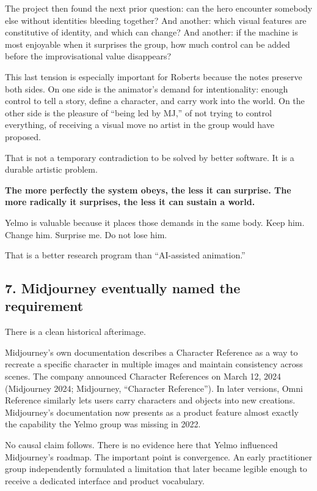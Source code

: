 \documentclass[
]{article}
\begin{document}
The project then found the next prior question: can the hero encounter
somebody else without identities bleeding together? And another: which
visual features are constitutive of identity, and which can change? And
another: if the machine is most enjoyable when it surprises the group,
how much control can be added before the improvisational value
disappears?

This last tension is especially important for Roberts because the notes
preserve both sides. On one side is the animator's demand for
intentionality: enough control to tell a story, define a character, and
carry work into the world. On the other side is the pleasure of ``being
led by MJ,'' of not trying to control everything, of receiving a visual
move no artist in the group would have proposed.

That is not a temporary contradiction to be solved by better software.
It is a durable artistic problem.

\textbf{The more perfectly the system obeys, the less it can surprise.
The more radically it surprises, the less it can sustain a world.}

Yelmo is valuable because it places those demands in the same body. Keep
him. Change him. Surprise me. Do not lose him.

That is a better research program than ``AI-assisted animation.''

\subsection{7. Midjourney eventually named the
requirement}\label{midjourney-eventually-named-the-requirement}

There is a clean historical afterimage.

Midjourney's own documentation describes a Character Reference as a way
to recreate a specific character in multiple images and maintain
consistency across scenes. The company announced Character References on
March 12, 2024 (Midjourney 2024; Midjourney, ``Character Reference'').
In later versions, Omni Reference similarly lets users carry characters
and objects into new creations. Midjourney's documentation now presents
as a product feature almost exactly the capability the Yelmo group was
missing in 2022.

No causal claim follows. There is no evidence here that Yelmo influenced
Midjourney's roadmap. The important point is convergence. An early
practitioner group independently formulated a limitation that later
became legible enough to receive a dedicated interface and product
vocabulary.
\end{document}
